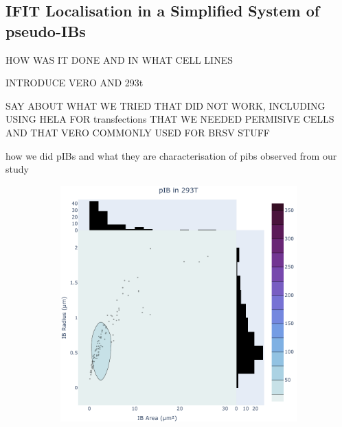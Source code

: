 \subsection{IFIT Localisation in a Simplified System of pseudo-IBs} \label{subsec:IFIT Localisation in a Simplified System of pseudo-IBs}
\lipsum[1-15]

HOW WAS IT DONE AND IN WHAT CELL LINES

INTRODUCE VERO AND 293t

SAY ABOUT WHAT WE TRIED THAT DID NOT WORK, INCLUDING USING HELA FOR transfections
THAT WE NEEDED PERMISIVE CELLS AND THAT VERO COMMONLY USED FOR BRSV STUFF

how we did pIBs and what they are
characterisation of pibs observed from our study

\begin{figure}
    \begin{subfigure}{0.495\textwidth}
        \caption{}
        \includegraphics[width=\textwidth]{09. Chapter 4/Figs/01. pIB/01. pIB characterisation/01. heatmap_pib-293t.pdf} 
    \end{subfigure}
    \hfill
    \begin{subfigure}{0.495\textwidth}
        \caption{}

\end{subfigure}
\end{figure}
